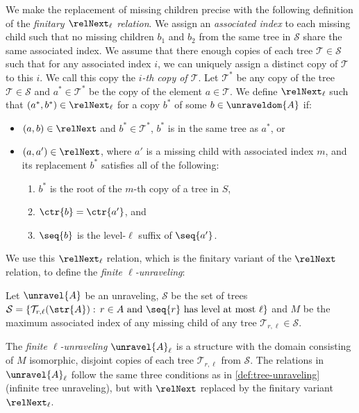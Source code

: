 We make the replacement of missing children precise with the following definition of the \emph{finitary $\relNext_{\ell}$ relation}.
We assign an \emph{associated index} to each missing child such that no missing children $b_{1}$ and $b_{2}$ from the same tree in $\mathcal{S}$ share the same associated index.
We assume that there enough copies of each tree $\mathcal{T} \in \mathcal{S}$ such that for any associated index $i$, we can uniquely assign a distinct copy of $\mathcal{T}$ to this $i$.
We call this copy the \emph{$i$-th copy of $\mathcal{T}$}.
Let $\mathcal{T}^{*}$ be any copy of the tree $\mathcal{T} \in \mathcal{S}$ and $a^{*} \in \mathcal{T}^{*}$ be the copy of the element $a \in \mathcal{T}$.
We define $\relNext_{\ell}$ such that $(a^{*}, b^{*}) \in \relNext_{\ell}$ for a copy $b^{*}$ of some $b \in \unraveldom{A}$ if:
  \begin{itemize}
    \item $(a,b) \in \relNext$ and $b^{*} \in \mathcal{T}^{*}$, \ie{} $b^{*}$ is in the same tree as $a^{*}$, or
    \item
          $(a,a') \in \relNext$, where $a'$ is a missing child with associated index $m$, and its replacement $b^{*}$ satisfies all of the following:
          \begin{enumerate}
            \item $b^{*}$ is the root of the $m$-th copy of a tree in $S$,
            \item $\ctr{b} = \ctr{a'}$, and
            \item $\seq{b}$ is the level-$\ell$ suffix of $\seq{a'}$.
          \end{enumerate}
  \end{itemize}
We use this $\relNext_{\ell}$ relation, which is the finitary variant of the $\relNext$ relation, to define the \emph{finite $\ell$-unraveling}:
\begin{definition}
  Let $\unravel{A}$ be an unraveling, $\mathcal{S}$ be the set of trees $\mathcal{S} = \left\{ \mathcal{T}_{r,\ell}(\str{A}):\, r \in A \text{ and } \seq{r}\ \text{has level at most $\ell$}\right\}$ and
  $M$ be the maximum associated index of any missing child of any tree $\mathcal{T}_{r,\ell} \in \mathcal{S}$.

  The \emph{finite $\ell$-unraveling} $\unravel{A}_{\ell}$ is a structure with the domain consisting of $M$ isomorphic, disjoint copies of each tree $\mathcal{T}_{r,\ell}$ from $\mathcal{S}$.
  The relations in $\unravel{A}_{\ell}$ follow the same three conditions as in \cref{def:tree-unraveling} (infinite tree unraveling), but with $\relNext$ replaced by the finitary variant $\relNext_{\ell}$.
\end{definition}

